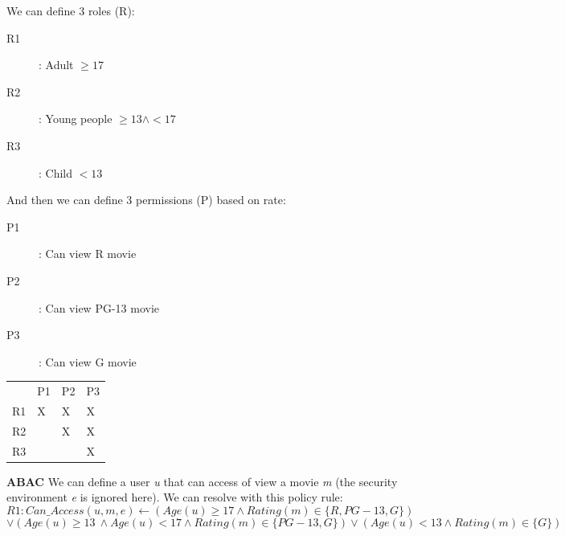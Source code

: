 \documentclass{article}
\begin{document}
                          We can define 3 roles (R): 
                            \begin{description}
                                \item [R1]: Adult $\geq 17$ 
                                \item [R2]: Young people $\geq 13 \land < 17$
                                \item [R3]: Child $ <13$
                            \end{description}
                          And then we can define 3 permissions (P) based on rate: 
                           \begin{description}
                            \item [P1]: Can view R movie
                            \item [P2]: Can view PG-13 movie
                            \item [P3]: Can view G movie
                           \end{description}

                           \begin{table}[h]
                            \centering
                           
                            \begin{tabular}{llll}
                             & P1 & P2 & P3 \\ \cline{2-4} 
                            R1 & X & X& X\\ \cline{2-4} 
                            R2 &  & X& X\\ \cline{2-4} 
                            R3 &  &  & X\\ \cline{2-4} 
                            \end{tabular}%
                        
                            \end{table}

                        \textbf{ABAC}
                            We can define a user \textit{u} that can access of view a movie \textit{m} (the security environment \textit{e} is ignored here). We can resolve with this policy rule: \\
                            \[R1:{Can\_Access( u,m,e) \leftarrow (Age( u) \geq 17 \land Rating(m)\in \{R,PG-13,G\})} \]   
                            \[ {\lor ( Age(u) \geq 13\ \land Age(u) < 17 \land Rating( m)\in \{PG-13,G\}) \lor (Age(u) < 13 \land Rating( m)\in \{G\})}\]
\end{document}
